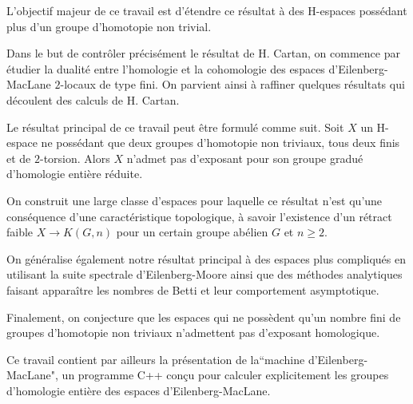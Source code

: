 \medskip
L'objectif majeur de ce travail est d'\'etendre ce r\'esultat \`a des H-espaces poss\'edant plus d'un groupe d'homotopie non trivial.

\medskip
Dans le but de contr\^oler pr\'ecis\'ement le r\'esultat de H. Cartan, on commence par \'etudier la dualit\'e entre l'homologie et la cohomologie des espaces d'Eilenberg-MacLane $2$-locaux de type fini. On parvient ainsi \`a raffiner quelques r\'esultats qui d\'ecoulent des calculs de H. Cartan. 

\medskip
Le r\'esultat principal de ce travail peut \^etre formul\'e comme suit. Soit $X$ un H-espace ne poss\'edant que deux groupes d'homotopie non triviaux, tous deux finis et de $2$-torsion. Alors $X$ n'admet pas d'exposant pour son groupe gradu\'e d'homologie enti\`ere r\'eduite.

\medskip
On construit une large classe d'espaces pour laquelle ce r\'esultat n'est qu'une cons\'equence d'une caract\'eristique topologique, \`a savoir l'existence d'un r\'etract faible $X\to K(G,n)$ pour un certain groupe ab\'elien $G$ et $n\geq2$.

\medskip
On g\'en\'eralise \'egalement notre r\'esultat principal \`a des espaces plus compliqu\'es en utilisant la suite spectrale d'Eilenberg-Moore ainsi que des m\'ethodes analytiques faisant appara\^itre les nombres de Betti et leur comportement asymptotique.

\medskip
Finalement, on conjecture que les espaces qui ne poss\`edent qu'un nombre fini de groupes d'homotopie non triviaux n'admettent pas d'exposant homologique.

\medskip
Ce travail contient par ailleurs la pr\'esentation de la``machine d'Eilenberg-MacLane", un programme C++ con\c{c}u pour calculer explicitement les groupes d'homologie enti\`ere des espaces d'Eilenberg-MacLane.


\endinput